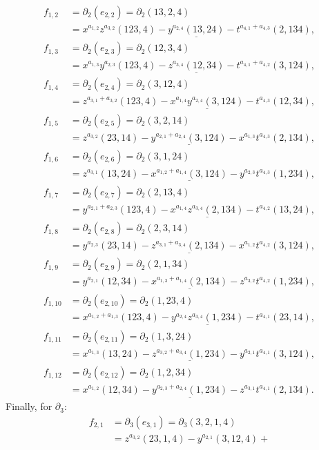 \documentclass[ALCO]{cedram}
\newcommand{\dif}{\mbox{$\partial$}}
\begin{document}
\begin{example}
\begin{align*}
f_{1,2}&=  \dif_2(e_{2,2})=\dif_2(13,2,4)\\ 
&= x^{a_{1,2}}z^{a_{3,2}}(123,4)-\underline{y^{a_{2,4}}(13,24)}-
t^{a_{4,1}+a_{4,3}}(2,134),\\
f_{1,3}&= \dif_2(e_{2,3})=\dif_2(12,3,4)\\
&= x^{a_{1,3}}y^{a_{2,3}}(123,4)-\underline{z^{a_{3,4}}(12,34)}-
t^{a_{4,1}+a_{4,2}}(3,124),\\
f_{1,4}&=\dif_2(e_{2,4})=\dif_2(3,12,4)\\ 
&= z^{a_{3,1}+a_{3,2}}(123,4)-\underline{x^{a_{1,4}}y^{a_{2,4}}(3,124)}-
t^{a_{4,3}}(12,34),\\
f_{1,5}&= \dif_2(e_{2,5})=\dif_2(3,2,14)\\
&= z^{a_{3,2}}(23,14)-\underline{y^{a_{2,1}+a_{2,4}}(3,124)}-
x^{a_{1,3}}t^{a_{4,3}}(2,134),\\
f_{1,6}&= \dif_2(e_{2,6})=\dif_2(3,1,24)\\ 
&= z^{a_{3,1}}(13,24)-\underline{x^{a_{1,2}+a_{1,4}}(3,124)}-
y^{a_{2,3}}t^{a_{4,3}}(1,234),\\
f_{1,7}&= \dif_2(e_{2,7})=\dif_2(2,13,4)\\
&= y^{a_{2,1}+a_{2,3}}(123,4)-\underline{x^{a_{1,4}}z^{a_{3,4}}(2,134)}-
t^{a_{4,2}}(13,24),\\
f_{1,8}&= \dif_2(e_{2,8})=\dif_2(2,3,14)\\ 
&= y^{a_{2,3}}(23,14)-\underline{z^{a_{3,1}+a_{3,4}}(2,134)}-
x^{a_{1,2}}t^{a_{4,2}}(3,124),\\
f_{1,9}&= \dif_2(e_{2,9})=\dif_2(2,1,34)\\
&= y^{a_{2,1}}(12,34)-\underline{x^{a_{1,3}+a_{1,4}}(2,134)}-
z^{a_{3,2}}t^{a_{4,2}}(1,234),\\
f_{1,10}&= \dif_2(e_{2,10})=\dif_2(1,23,4)\\ 
&= x^{a_{1,2}+a_{1,3}}(123,4)-\underline{y^{a_{2,4}}z^{a_{3,4}}(1,234)}-
t^{a_{4,1}}(23,14),\\
f_{1,11}&=\dif_2(e_{2,11})=\dif_2(1,3,24)\\
&= x^{a_{1,3}}(13,24)-\underline{z^{a_{3,2}+a_{3,4}}(1,234)}-
y^{a_{2,1}}t^{a_{4,1}}(3,124),\\
f_{1,12}&= \dif_2(e_{2,12})=\dif_2(1,2,34)\\ 
&= x^{a_{1,2}}(12,34)-\underline{y^{a_{2,3}+a_{2,4}}(1,234)}-
z^{a_{3,1}}t^{a_{4,1}}(2,134).
\end{align*}
Finally, for $\dif_3$:
\begin{align*}
f_{2,1}&= \dif_3(e_{3,1})=
\dif_3(3,2,1,4)\\ &= z^{a_{3,2}}(23,1,4)-y^{a_{2,1}}(3,12,4)+

\end{align*}
\end{example}
\end{document}

